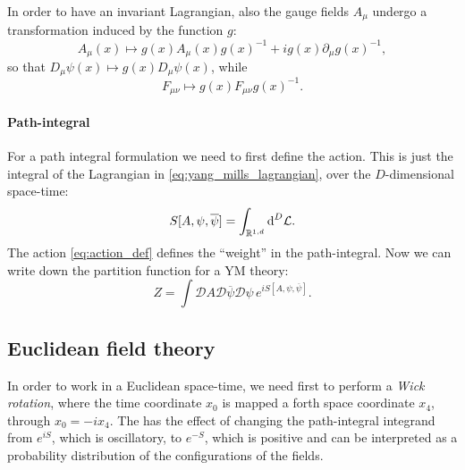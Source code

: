 In order to have an invariant Lagrangian, also the gauge fields $A_{\mu}$ undergo a transformation induced by the function $g$:
\begin{equation}
    A_{\mu}(x) \mapsto g(x) A_{\mu}(x) g(x)^{-1} + i g(x) \partial_{\mu} g(x)^{-1},
\end{equation}
so that $D_{\mu} \psi(x) \mapsto g(x) D_{\mu} \psi(x)$, while
\begin{equation}
    F_{\mu \nu} \mapsto g(x) F_{\mu \nu} g(x)^{-1}.
\end{equation}


\paragraph*{Path-integral}

For a path integral formulation we need to first define the action.
This is just the integral of the Lagrangian in \eqref{eq:yang_mills_lagrangian}, over the $D$-dimensional space-time:
\begin{equation}
    S[A, \psi, \overline{\psi}] = \int_{\mathbb{R}^{1,d}}  \text{\normalfont d}^{D} \mathcal{L}.
    \label{eq:action_def}
\end{equation}
The action \eqref{eq:action_def} defines the ``weight'' in the path-integral.
Now we can write down the partition function for a YM theory:
\begin{equation}
    Z = \int \mathcal{D} A \mathcal{D} \overline{\psi} \mathcal{D} \psi \, e^{i S[A, \psi, \overline{\psi}]}.
\end{equation}


\subsection{Euclidean field theory}
\label{sub:euclidean_field_theory}

In order to work in a Euclidean space-time, we need first to perform a \emph{Wick rotation}, where the time coordinate $x_0$ is mapped a forth space coordinate $x_4$, through $x_0 = - i x_4$.
The has the effect of changing the path-integral integrand from $e^{i S}$, which is oscillatory, to $e^{-S}$, which is positive and can be interpreted as a probability distribution of the configurations of the fields.

